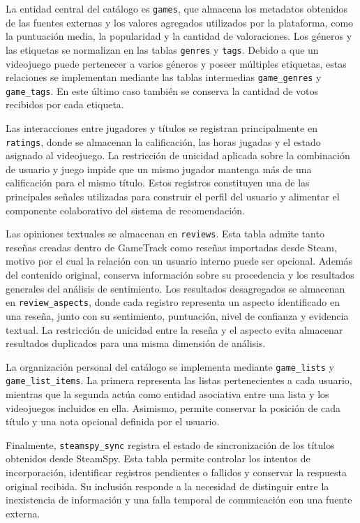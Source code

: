 La entidad central del catálogo es \texttt{games}, que almacena los metadatos obtenidos de las fuentes externas y los valores agregados utilizados por la plataforma, como la puntuación media, la popularidad y la cantidad de valoraciones. Los géneros y las etiquetas se normalizan en las tablas \texttt{genres} y \texttt{tags}. Debido a que un videojuego puede pertenecer a varios géneros y poseer múltiples etiquetas, estas relaciones se implementan mediante las tablas intermedias \texttt{game\_genres} y \texttt{game\_tags}. En este último caso también se conserva la cantidad de votos recibidos por cada etiqueta.

Las interacciones entre jugadores y títulos se registran principalmente en \texttt{ratings}, donde se almacenan la calificación, las horas jugadas y el estado asignado al videojuego. La restricción de unicidad aplicada sobre la combinación de usuario y juego impide que un mismo jugador mantenga más de una calificación para el mismo título. Estos registros constituyen una de las principales señales utilizadas para construir el perfil del usuario y alimentar el componente colaborativo del sistema de recomendación.

Las opiniones textuales se almacenan en \texttt{reviews}. Esta tabla admite tanto reseñas creadas dentro de GameTrack como reseñas importadas desde Steam, motivo por el cual la relación con un usuario interno puede ser opcional. Además del contenido original, conserva información sobre su procedencia y los resultados generales del análisis de sentimiento. Los resultados desagregados se almacenan en \texttt{review\_aspects}, donde cada registro representa un aspecto identificado en una reseña, junto con su sentimiento, puntuación, nivel de confianza y evidencia textual. La restricción de unicidad entre la reseña y el aspecto evita almacenar resultados duplicados para una misma dimensión de análisis.

La organización personal del catálogo se implementa mediante \texttt{game\_lists} y \texttt{game\_list\_items}. La primera representa las listas pertenecientes a cada usuario, mientras que la segunda actúa como entidad asociativa entre una lista y los videojuegos incluidos en ella. Asimismo, permite conservar la posición de cada título y una nota opcional definida por el usuario.

Finalmente, \texttt{steamspy\_sync} registra el estado de sincronización de los títulos obtenidos desde SteamSpy. Esta tabla permite controlar los intentos de incorporación, identificar registros pendientes o fallidos y conservar la respuesta original recibida. Su inclusión responde a la necesidad de distinguir entre la inexistencia de información y una falla temporal de comunicación con una fuente externa.

